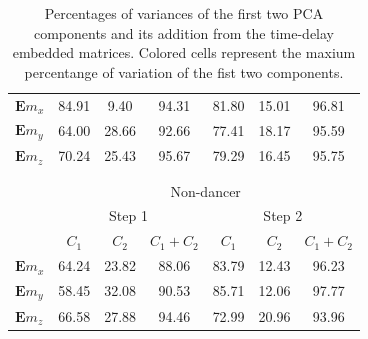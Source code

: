 \documentclass{sigchi}
\begin{document}
\begin{table}
\begin{tabular}{l c c c c c c }
$\boldsymbol{E} m_{x}$ & 84.91 & 9.40 & 94.31 & 81.80 & 15.01 & \cellcolor{blue!25}96.81 \\
$\boldsymbol{E} m_{y}$ & 64.00 & 28.66 & 92.66 & 77.41 & 18.17 & 95.59 \\
$\boldsymbol{E} m_{z}$ & 70.24 & 25.43 & \cellcolor{blue!25}95.67 & 79.29 & 16.45 & 95.75  \\

\\
\\
& \multicolumn{6}{c}{Non-dancer} \\
\cmidrule(r){2-7}

& \multicolumn{3}{c}{Step 1} & \multicolumn{3}{c}{Step 2}\\
\cmidrule(lr){2-4} \cmidrule(lr){5-7}
     & $C_1$  & $C_2$  & $C_1+C_2$  & $C_1$  & $C_2$  & $C_1+C_2$  \\
\midrule

$\boldsymbol{E} m_{x}$ & 64.24 & 23.82 & 88.06 & 83.79 & 12.43 & 96.23 \\
$\boldsymbol{E} m_{y}$ & 58.45 & 32.08 & 90.53 & 85.71 & 12.06 & \cellcolor{blue!25}97.77 \\
$\boldsymbol{E} m_{z}$ & 66.58 & 27.88 & \cellcolor{blue!25}94.46 & 72.99 & 20.96 & 93.96 \\

\bottomrule
\end{tabular}

  \caption{Percentages of variances of the first two PCA components and its addition
  from the time-delay embedded matrices.
  Colored cells represent the maxium percentange of variation of the fist two components.}
  \label{tab:table1}
\end{table}
\end{document}
